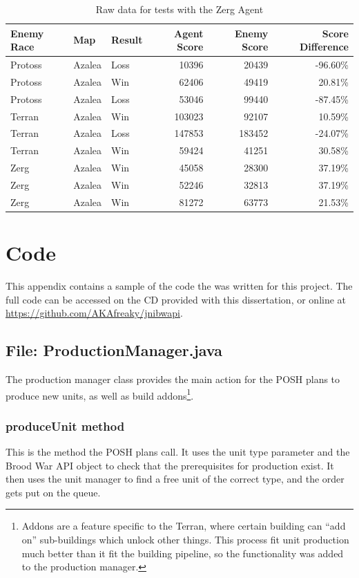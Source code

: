 \documentclass[11pt,openright,a4paper]{report}
\begin{document}
\begin{table}[h]
  \centering
  \begin{tabular}{| l | l | l | r | r | r |}
    \hline
    Enemy Race & Map & Result & Agent Score & Enemy Score & Score Difference \\ \hline
    Protoss & Azalea & Loss & 10396 & 20439 & -96.60\% \\ \hline
    Protoss & Azalea & Win & 62406 & 49419 & 20.81\% \\ \hline
    Protoss & Azalea & Loss & 53046 & 99440 & -87.45\% \\ \hline
    Terran & Azalea & Win & 103023 & 92107 & 10.59\% \\ \hline
    Terran & Azalea & Loss & 147853 & 183452 & -24.07\% \\ \hline
    Terran & Azalea & Win & 59424 & 41251 & 30.58\% \\ \hline
    Zerg & Azalea & Win & 45058 & 28300 & 37.19\% \\ \hline
    Zerg & Azalea & Win & 52246 & 32813 & 37.19\% \\ \hline
    Zerg & Azalea & Win & 81272 & 63773 & 21.53\% \\ \hline
  \end{tabular}
  \caption{Raw data for tests with the Zerg Agent}\label{DataRawZerg}
\end{table}


\chapter{Code}
This appendix contains a sample of the code the was written for this project. The full code can be accessed on the CD provided with this dissertation, or online at \url{https://github.com/AKAfreaky/jnibwapi}.
\section{File: ProductionManager.java}
The production manager class provides the main action for the POSH plans to produce new units, as well as build addons\footnote{Addons are a feature specific to the Terran, where certain building can ``add on'' sub-buildings which unlock other things. This process fit unit production much better than it fit the building pipeline, so the functionality was added to the production manager.}.
\subsection{produceUnit method}
This is the method the POSH plans call. It uses the unit type parameter and the Brood War API object to check that the prerequisites for production exist. It then uses the unit manager to find a free unit of the correct type, and the order gets put on the queue.

\end{document}
